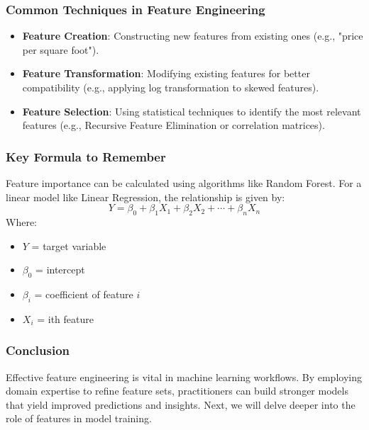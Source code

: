 \documentclass[aspectratio=169]{beamer}
\begin{document}
\begin{frame}[fragile]
    \frametitle{Common Techniques in Feature Engineering}
    \begin{itemize}
        \item \textbf{Feature Creation}: Constructing new features from existing ones (e.g., "price per square foot").
        \item \textbf{Feature Transformation}: Modifying existing features for better compatibility (e.g., applying log transformation to skewed features).
        \item \textbf{Feature Selection}: Using statistical techniques to identify the most relevant features (e.g., Recursive Feature Elimination or correlation matrices).
    \end{itemize}
\end{frame}

\begin{frame}[fragile]
    \frametitle{Key Formula to Remember}
    Feature importance can be calculated using algorithms like Random Forest. For a linear model like Linear Regression, the relationship is given by:
    \begin{equation}
      Y = \beta_0 + \beta_1X_1 + \beta_2X_2 + \cdots + \beta_nX_n
    \end{equation}
    Where:
    \begin{itemize}
        \item \( Y \) = target variable
        \item \( \beta_0 \) = intercept
        \item \( \beta_i \) = coefficient of feature \( i \)
        \item \( X_i \) = ith feature
    \end{itemize}
\end{frame}

\begin{frame}[fragile]
    \frametitle{Conclusion}
    Effective feature engineering is vital in machine learning workflows. By employing domain expertise to refine feature sets, practitioners can build stronger models that yield improved predictions and insights. Next, we will delve deeper into the role of features in model training.
\end{frame}
\end{document}
